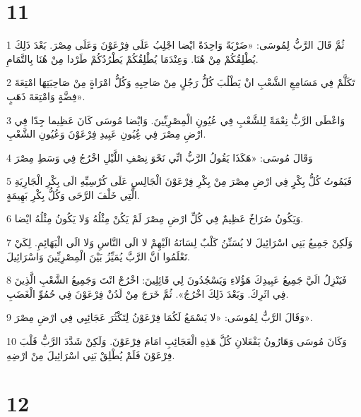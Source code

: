 \chapter{11}

\par 1 ثُمَّ قَالَ الرَّبُّ لِمُوسَى: «ضَرْبَةً وَاحِدَةً ايْضا اجْلِبُ عَلَى فِرْعَوْنَ وَعَلَى مِصْرَ. بَعْدَ ذَلِكَ يُطْلِقُكُمْ مِنْ هُنَا. وَعِنْدَمَا يُطْلِقُكُمْ يَطْرُدُكُمْ طَرْدا مِنْ هُنَا بِالتَّمَامِ.
\par 2 تَكَلَّمْ فِي مَسَامِعِ الشَّعْبِ انْ يَطْلُبَ كُلُّ رَجُلٍ مِنْ صَاحِبِهِ وَكُلُّ امْرَاةٍ مِنْ صَاحِبَتِهَا امْتِعَةَ فِضَّةٍ وَامْتِعَةَ ذَهَبٍ».
\par 3 وَاعْطَى الرَّبُّ نِعْمَةً لِلشَّعْبِ فِي عُيُونِ الْمِصْرِيِّينَ. وَايْضا مُوسَى كَانَ عَظِيما جِدّا فِي ارْضِ مِصْرَ فِي عُِيُونِ عَبِيدِ فِرْعَوْنَ وَعُيُونِ الشَّعْبِ.
\par 4 وَقَالَ مُوسَى: «هَكَذَا يَقُولُ الرَّبُّ انِّي نَحْوَ نِصْفِ اللَّيْلِ اخْرُجُ فِي وَسَطِ مِصْرَ
\par 5 فَيَمُوتُ كُلُّ بِكْرٍ فِي ارْضِ مِصْرَ مِنْ بِكْرِ فِرْعَوْنَ الْجَالِسِ عَلَى كُرْسِيِّهِ الَى بِكْرِ الْجَارِيَةِ الَّتِي خَلْفَ الرَّحَى وَكُلُّ بِكْرِ بَهِيمَةٍ.
\par 6 وَيَكُونُ صُرَاخٌ عَظِيمٌ فِي كُلِّ ارْضِ مِصْرَ لَمْ يَكُنْ مِثْلُهُ وَلا يَكُونُ مِثْلُهُ ايْضا.
\par 7 وَلَكِنْ جَمِيعُ بَنِي اسْرَائِيلَ لا يُسَنِّنُ كَلْبٌ لِسَانَهُ الَيْهِمْ لا الَى النَّاسِ وَلا الَى الْبَهَائِمِ. لِكَيْ تَعْلَمُوا انَّ الرَّبَّ يُمَيِّزُ بَيْنَ الْمِصْرِيِّينَ وَاسْرَائِيلَ.
\par 8 فَيَنْزِلُ الَيَّ جَمِيعُ عَبِيدِكَ هَؤُلاءِ وَيَسْجُدُونَ لِي قَائِلِينَ: اخْرُجْ انْتَ وَجَمِيعُ الشَّعْبِ الَّذِينَ فِي اثَرِكَ. وَبَعْدَ ذَلِكَ اخْرُجُ». ثُمَّ خَرَجَ مِنْ لَدُنْ فِرْعَوْنَ فِي حُمُوِّ الْغَضَبِ.
\par 9 وَقَالَ الرَّبُّ لِمُوسَى: «لا يَسْمَعُ لَكُمَا فِرْعَوْنُ لِتَكْثُرَ عَجَائِبِي فِي ارْضِ مِصْرَ».
\par 10 وَكَانَ مُوسَى وَهَارُونُ يَفْعَلانِ كُلَّ هَذِهِ الْعَجَائِبِ امَامَ فِرْعَوْنَ. وَلَكِنْ شَدَّدَ الرَّبُّ قَلْبَ فِرْعَوْنَ فَلَمْ يُطْلِقْ بَنِي اسْرَائِيلَ مِنْ ارْضِهِ.

\chapter{12}


